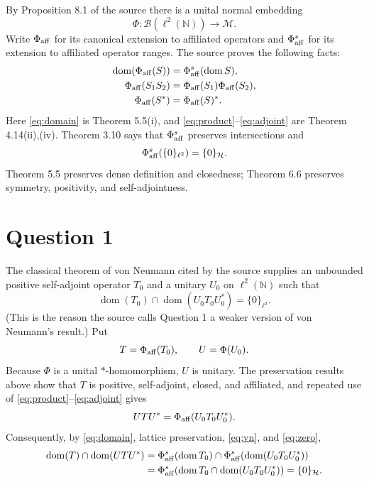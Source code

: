 \documentclass[11pt]{article}
\newcommand{\B}{\mathcal B}
\newcommand{\domn}{\operatorname{dom}}
\begin{document}
By Proposition 8.1 of the source there is a unital normal embedding
\[
 \Phi:\B(\ell^2(\mathbb N))\longrightarrow\mathscr M.
\]
Write $\Phi_{\rm aff}$ for its canonical extension to affiliated operators
and $\Phi_{\rm aff}^s$ for its extension to affiliated operator ranges.  The
source proves the following facts:
\begin{align}
 \domn(\Phi_{\rm aff}(S))
   &=\Phi_{\rm aff}^s(\domn S),                                      \label{eq:domain}\\
 \Phi_{\rm aff}(S_1S_2)
   &=\Phi_{\rm aff}(S_1)\Phi_{\rm aff}(S_2),                         \label{eq:product}\\
 \Phi_{\rm aff}(S^*)&=\Phi_{\rm aff}(S)^*.                          \label{eq:adjoint}
\end{align}
Here \eqref{eq:domain} is Theorem 5.5(i), and
\eqref{eq:product}--\eqref{eq:adjoint} are Theorem 4.14(ii),(iv).
Theorem 3.10 says that $\Phi_{\rm aff}^s$ preserves intersections and
\begin{equation}
\label{eq:zero}
 \Phi_{\rm aff}^s(\{0\}_{\ell^2})=\{0\}_{\mathcal H}.
\end{equation}
Theorem 5.5 preserves dense definition and closedness; Theorem 6.6 preserves
symmetry, positivity, and self-adjointness.

\section{Question 1}

The classical theorem of von Neumann cited by the source supplies an
unbounded positive self-adjoint operator $T_0$ and a unitary $U_0$ on
$\ell^2(\mathbb N)$ such that
\begin{equation}\label{eq:vn}
 \domn(T_0)\cap\domn(U_0T_0U_0^*)=\{0\}_{\ell^2}.
\end{equation}
(This is the reason the source calls Question 1 a weaker version of von
Neumann's result.)  Put
\[
 T=\Phi_{\rm aff}(T_0),\qquad U=\Phi(U_0).
\]
Because $\Phi$ is a unital $*$-homomorphism, $U$ is unitary.  The preservation
results above show that $T$ is positive, self-adjoint, closed, and affiliated,
and repeated use of \eqref{eq:product}--\eqref{eq:adjoint} gives
\[
 UTU^*=\Phi_{\rm aff}(U_0T_0U_0^*).
\]
Consequently, by \eqref{eq:domain}, lattice preservation, \eqref{eq:vn}, and
\eqref{eq:zero},
\begin{align*}
 \domn(T)\cap\domn(UTU^*)
 &=\Phi_{\rm aff}^s(\domn T_0)
     \cap\Phi_{\rm aff}^s(\domn(U_0T_0U_0^*))\\
 &=\Phi_{\rm aff}^s\!\left(
      \domn T_0\cap\domn(U_0T_0U_0^*)\right)
  =\{0\}_{\mathcal H}.
\end{align*}
\end{document}
